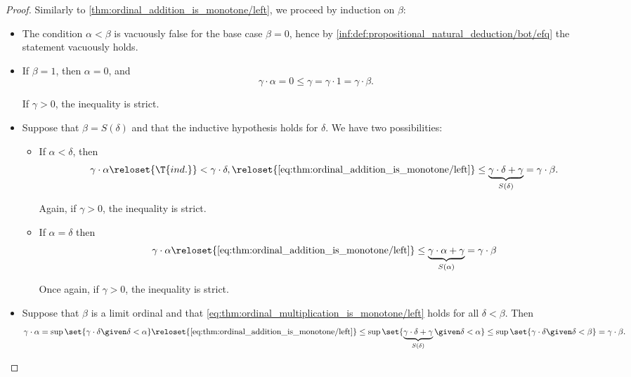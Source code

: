 \begin{proof}
   Similarly to \cref{thm:ordinal_addition_is_monotone/left}, we proceed by induction on \( \beta \):
  \begin{itemize}
    \item The condition \( \alpha < \beta \) is vacuously false for the base case \( \beta = 0 \), hence by \ref{inf:def:propositional_natural_deduction/bot/efq} the statement vacuously holds.

    \item If \( \beta = 1 \), then \( \alpha = 0 \), and
    \begin{equation}\label{thm:ordinal_multiplication_is_monotone/left/ind_base}
      \gamma \cdot \alpha = 0 \leq \gamma = \gamma \cdot 1 = \gamma \cdot \beta.
    \end{equation}

    If \( \gamma > 0 \), the inequality is strict.

    \item Suppose that \( \beta = S(\delta) \) and that the inductive hypothesis holds for \( \delta \). We have two possibilities:
    \begin{itemize}
      \item If \( \alpha < \delta \), then
      \begin{equation*}
        \gamma \cdot \alpha
        \reloset {\T{ind.}} <
        \gamma \cdot \delta,
        \reloset {\eqref{eq:thm:ordinal_addition_is_monotone/left}} \leq
        \underbrace{\gamma \cdot \delta + \gamma}_{S(\delta)}
        =
        \gamma \cdot \beta.
      \end{equation*}

      Again, if \( \gamma > 0 \), the inequality is strict.

      \item If \( \alpha = \delta \) then
      \begin{equation*}
        \gamma \cdot \alpha
        \reloset {\eqref{eq:thm:ordinal_addition_is_monotone/left}} \leq
        \underbrace{\gamma \cdot \alpha + \gamma}_{S(\alpha)}
        =
        \gamma \cdot \beta
      \end{equation*}

      Once again, if \( \gamma > 0 \), the inequality is strict.
    \end{itemize}

    \item Suppose that \( \beta \) is a limit ordinal and that \eqref{eq:thm:ordinal_multiplication_is_monotone/left} holds for all \( \delta < \beta \). Then
    \begin{equation*}
      \gamma \cdot \alpha
      =
      \sup\set{ \gamma \cdot \delta \given \delta < \alpha }
      \reloset {\eqref{eq:thm:ordinal_addition_is_monotone/left}} \leq
      \sup\set{ \underbrace{\gamma \cdot \delta + \gamma}_{S(\delta)} \given \delta < \alpha }
      \leq
      \sup\set{ \gamma \cdot \delta \given \delta < \beta }
      =
      \gamma \cdot \beta.
    \end{equation*}


\end{itemize}
\end{proof}
